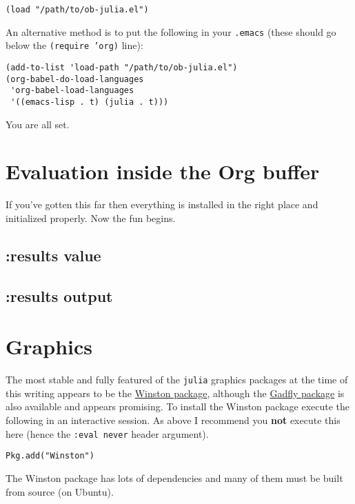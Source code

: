 \documentclass[11pt]{article}
\begin{document}
\begin{verbatim}
(load "/path/to/ob-julia.el")
\end{verbatim}

An alternative method is to put the following in your \texttt{.emacs} (these
should go below the \texttt{(require 'org)} line):

\begin{verbatim}
(add-to-list 'load-path "/path/to/ob-julia.el")
(org-babel-do-load-languages
 'org-babel-load-languages
 '((emacs-lisp . t) (julia . t)))
\end{verbatim}

You are all set.
\section[Evaluation inside the Org buffer]{Evaluation inside the Org buffer}
\label{sec-2}

If you've gotten this far then everything is installed in the right
place and initialized properly. Now the fun begins.

\subsection[:results value]{:results value}
\label{sec-2-1}

\subsection[:results output]{:results output}
\label{sec-2-2}
\section[Graphics]{Graphics}
\label{sec-3}

The most stable and fully featured of the \texttt{julia} graphics packages at
the time of this writing appears to be the \href{https://github.com/nolta/Winston.jl}{Winston package}, although
the \href{https://github.com/dcjones/Gadfly.jl}{Gadfly package} is also available and appears promising.  To
install the Winston package execute the following in an interactive
session.  As above I recommend you \textbf{not} execute this here (hence the
\texttt{:eval never} header argument).

\begin{verbatim}
Pkg.add("Winston")
\end{verbatim}

The Winston package has lots of dependencies and many of them must be
built from source (on Ubuntu).
\end{document}
